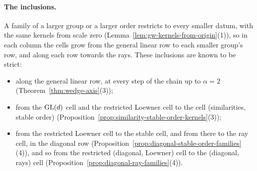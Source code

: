 \paragraph{The inclusions.} A family of a larger group or a larger order restricts to every smaller
datum, with the same kernels from scale zero (Lemma~\ref{lem:gw-kernels-from-origin}(1)), so in each column
the cells grow from the general linear row to each smaller group's row, and along each row towards the
rays. These inclusions are known to be strict:
\begin{itemize}
\item along the general linear row, at every step of the chain up to $\alpha = 2$
(Theorem~\ref{thm:wedge-axis}(3));
\item from the $\mathrm{GL}(d)$ cell and the restricted Loewner cell to the cell (similarities, stable order)
(Proposition~\ref{prop:similarity-stable-order-kernels}(3));
\item from the restricted Loewner cell to the stable cell, and from there to the ray cell, in the diagonal
row (Proposition~\ref{prop:diagonal-stable-order-families}(4)), and so from the restricted (diagonal,
Loewner) cell to the (diagonal, rays) cell (Proposition~\ref{prop:diagonal-ray-families}(4)).
\end{itemize}

